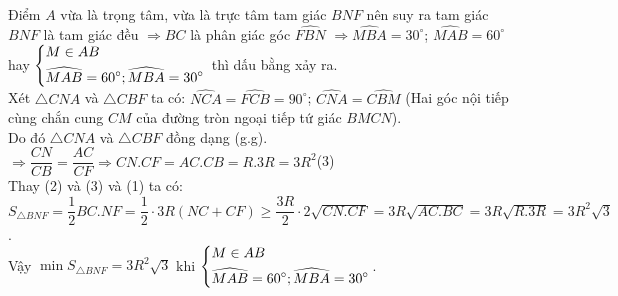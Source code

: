 \begin{ex}
{\begin{enumerate}
         Điểm $A$ vừa là trọng tâm, vừa là trực tâm tam giác $BNF$ nên suy ra tam giác $BNF$ là tam giác đều
         $\Rightarrow BC$ là phân giác góc $\widehat{FBN}$ $\Rightarrow \widehat{MBA}=30^{\circ}$; $\widehat{MAB}=60^{\circ}$\\ 
         hay $\left\{\begin{aligned}&M\in AB\\&\widehat{MAB}=60^{\circ}; \widehat{MBA}=30^{\circ}\end{aligned}\right.$ thì dấu bằng xảy ra.\\
         Xét $\triangle CNA$ và $\triangle CBF$ ta có: $\widehat{NCA}=\widehat{FCB}=90^{\circ}$; $\widehat{CNA}=\widehat{CBM}$ (Hai góc nội tiếp cùng chắn cung $CM$ của đường tròn ngoại tiếp tứ giác $BMCN$).\\
         Do đó $\triangle CNA$ và $\triangle CBF$ đồng dạng (g.g).\\
         $\Rightarrow \dfrac{CN}{CB}=\dfrac{AC}{CF}\Rightarrow CN.CF=AC.CB=R.3R=3R^2$\quad(3)\\
         Thay (2) và (3) và (1) ta có:\\
         $S_{\triangle BNF}=\dfrac{1}{2}BC.NF=\dfrac{1}{2}\cdot 3R(NC+CF)\geq \dfrac{3R}{2}\cdot 2\sqrt{CN.CF}=3R\sqrt{AC.BC}=3R\sqrt{R.3R}=3R^2\sqrt{3}$.\\
         Vậy $\min S_{\triangle BNF}=3R^2\sqrt{3}$ khi $\left\{\begin{aligned}&M\in AB\\&\widehat{MAB}=60^{\circ}; \widehat{MBA}=30^{\circ}\end{aligned}\right.$.
     \end{enumerate}}
\end{ex}


